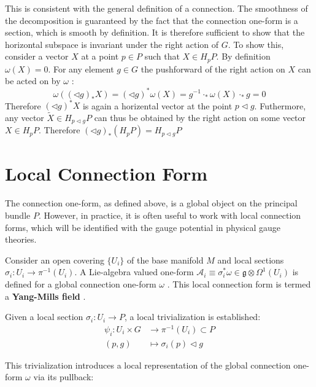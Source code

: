 This is consistent with the general definition of a connection. The smoothness of the decomposition is guaranteed by the fact that the connection one-form is a section, which is smooth by definition. It is therefore sufficient to show that the horizontal subspace is invariant under the right action of \( G \).
To show this, consider a vector $X$ at a point $p \in P$ such that $X \in H_pP$. By definition $\omega(X) = 0$. For any element $g \in G$ the pushforward of the right action on $X$ can be acted on by $\omega$ \cite{NakaharaGeometrytopologyphysics2005}:
\[ \omega((\triangleleft g)_* X) = (\triangleleft g)^* \omega(X) = g^{-1} \cdot_* \omega(X) \cdot_* g = 0 \]
Therefore $(\triangleleft g)^* X$ is again a horizental vector at the point $p\triangleleft g$. Futhermore, any vector $\tilde{X} \in H_{p\triangleleft g}P$ can thus be obtained by the right action on some vector $X \in H_pP$. Therefore $ (\triangleleft g)_* (H_pP) = H_{p \triangleleft g}P $


\section{Local Connection Form}

The connection one-form, as defined above, is a global object on the principal bundle \( P \). However, in practice, it is often useful to work with local connection forms, which will be identified with the gauge potential in physical gauge theories.

Consider an open covering \( \{U_i\} \) of the base manifold \( M \) and local sections \( \sigma_i : U_i \rightarrow \pi^{-1}(U_i) \). A Lie-algebra valued one-form \( \mathcal{A}_i \equiv \sigma_i^* \omega \in \mathfrak{g} \otimes\Omega^1(U_i) \) is defined for a global connection one-form \( \omega \) \cite{NakaharaGeometrytopologyphysics2005}. This local connection form is termed a \textbf{Yang-Mills field} \cite{FredericSchullerLocalrepresentationsconnectionbasemanifoldYangMillsfieldsLec222015}.

Given a local section \( \sigma_i : U_i \to P \), a local trivialization is established:
\begin{align*}
  \psi_i : U_i \times G &\longrightarrow \pi^{-1}(U_i) \subset P \\
  (p, g) &\mapsto \sigma_i(p) \triangleleft g
\end{align*}

This trivialization introduces a local representation of the global connection one-form \( \omega \) via its pullback:

